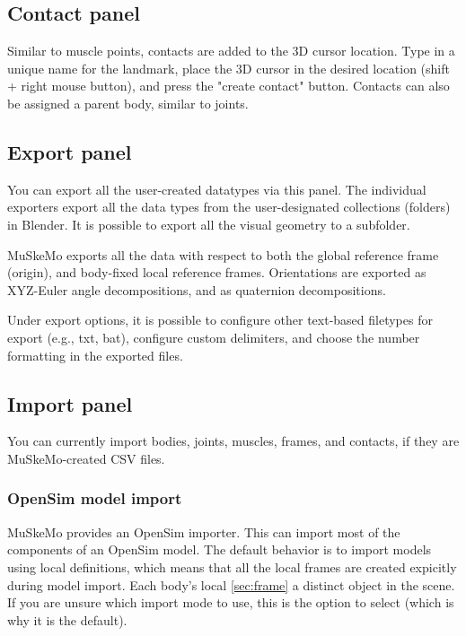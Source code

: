 \documentclass{article}
\begin{document}
\subsection{Contact panel}

Similar to muscle points, contacts are added to the 3D cursor location. Type in a unique name for the landmark, place the 3D cursor in the desired location (shift + right mouse button), and press the "create contact" button. Contacts can also be assigned a parent body, similar to joints.

\subsection{Export panel}
\label{sec:exportpanel}
You can export all the user-created datatypes via this panel. The individual exporters export all the data types from the user-designated collections (folders) in Blender. It is possible to export all the visual geometry to a subfolder.

MuSkeMo exports all the data with respect to both the global reference frame (origin), and body-fixed local reference frames. Orientations are exported as XYZ-Euler angle decompositions, and as quaternion decompositions.

Under export options, it is possible to configure other text-based filetypes for export (e.g., txt, bat), configure custom delimiters, and choose the number formatting in the exported files.


\subsection{Import panel}

You can currently import bodies, joints, muscles, frames, and contacts, if they are MuSkeMo-created CSV files.

\subsubsection{OpenSim model import}
\label{sec:opensimimporter}
MuSkeMo provides an OpenSim importer. This can import most of the components of an OpenSim model. The default behavior is to import models using local definitions, which means that all the local frames are created expicitly during model import. Each body's local \ref{sec:frame} a distinct object in the scene. If you are unsure which import mode to use, this is the option to select (which is why it is the default).
\end{document}

